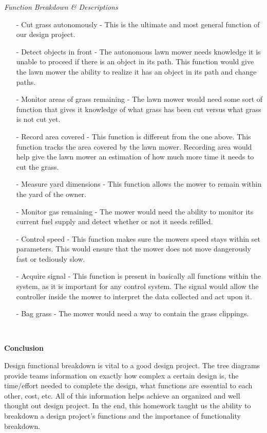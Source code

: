 \documentclass{article}
\begin{document}
    \noindent\textit{Function Breakdown \& Descriptions}
    
    \begin{itemize}
		\item[-] Cut grass autonomously - This is the ultimate and most general function of our design project.
		\item[-] Detect objects in front - The autonomous lawn mower needs knowledge it is unable to proceed if there is an object in its path. This function would give the lawn mower the ability to realize it has an object in its path and change paths. 
		\item[-] Monitor areas of grass remaining - The lawn mower would need some sort of function that gives it knowledge of what grass has been cut versus what grass is not cut yet. 
		\item[-] Record area covered - This function is different from the one above. This function tracks the area covered by the lawn mower. Recording area would help give the lawn mower an estimation of how much more time it needs to cut the grass. 
		\item[-] Measure yard dimensions - This function allows the mower to remain within the yard of the owner.
		\item[-] Monitor gas remaining - The mower would need the ability to monitor its current fuel supply and detect whether or not it needs refilled. 
		\item[-] Control speed - This function makes sure the mowers speed stays within set parameters. This would ensure that the mower does not move dangerously fast or tediously slow.
		\item[-] Acquire signal - This function is present in basically all functions within the system, as it is important for any control system. The signal would allow the controller inside the mower to interpret the data collected and act upon it.
		\item[-] Bag grass - The mower would need a way to contain the grass clippings.

    \end{itemize}~\\
    
    \noindent\begin{large}\textbf{Conclusion}\end{large}
    
    Design functional breakdown is vital to a good design project. The tree diagrams provide teams information on exactly how complex a certain design is, the time/effort needed to complete the design, what functions are essential to each other, cost, etc. All of this information helps achieve an organized and well thought out design project. In the end, this homework taught us the ability to breakdown a design project’s functions and the importance of functionality breakdown.\\
    
\end{document}
